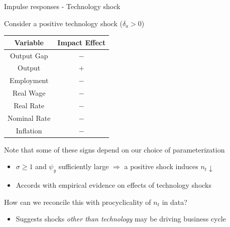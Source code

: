 \documentclass{beamer}
\begin{document}
\begin{frame}{Impulse responses - Technology shock}

Consider a positive technology shock ($\delta_{a} > 0$)
\begin{table}
\begin{tabular}{ c | c}
\textbf{Variable} 	& \textbf{Impact Effect}	\\ \hline \hline
  Output Gap			& $-$				\\
  Output				& $+$				\\
  Employment		& $-$				\\
  Real Wage			& $-$				\\
  Real Rate			& $-$				\\
  Nominal Rate		& $-$				\\
  Inflation			& $-$				\\ \hline \hline
\end{tabular}
\end{table}

Note that some of these signs depend on our choice of parameterization
\begin{itemize}
\item	$\sigma\geq1$ and $\psi_{y}$ sufficiently large $\Rightarrow$ a positive shock induces $n_{t}\downarrow$
\item	Accords with empirical evidence on effects of technology shocks
\end{itemize}

How can we reconcile this with procyclicality of $n_{t}$ in data?
\begin{itemize}
\item	Suggests shocks \emph{other than technology} may be driving business cycle
\end{itemize}

\end{frame}
\end{document}
